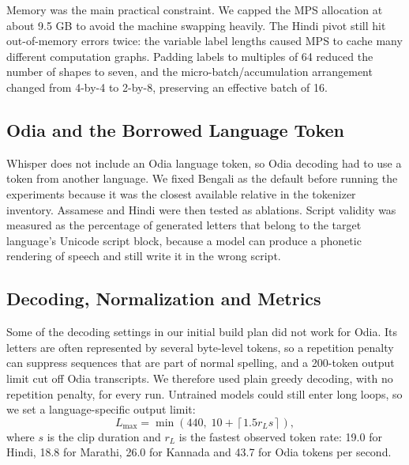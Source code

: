\documentclass[conference]{IEEEtran}
\begin{document}
Memory was the main practical constraint. We capped the MPS allocation
at about 9.5 GB to avoid the machine swapping heavily. The Hindi pivot
still hit out-of-memory errors twice: the variable label lengths caused
MPS to cache many different computation graphs. Padding labels to
multiples of 64 reduced the number of shapes to seven, and the
micro-batch/accumulation arrangement changed from 4-by-4 to 2-by-8,
preserving an effective batch of 16.

\subsection{Odia and the Borrowed Language Token}

Whisper does not include an Odia language token, so Odia decoding had
to use a token from another language. We fixed Bengali as the default
before running the experiments because it was the closest available
relative in the tokenizer inventory. Assamese and Hindi were then tested
as ablations. Script validity was measured as the percentage of
generated letters that belong to the target language's Unicode script
block, because a model can produce a phonetic rendering of speech and
still write it in the wrong script.

\subsection{Decoding, Normalization and Metrics}

Some of the decoding settings in our initial build plan did not work
for Odia. Its letters are often represented by several byte-level
tokens, so a repetition penalty can suppress sequences that are part of
normal spelling, and a 200-token output limit cut off Odia transcripts.
We therefore used plain greedy decoding, with no repetition penalty,
for every run. Untrained models could still enter long loops, so we
set a language-specific output limit:
\begin{equation*}
L_{\max}=\min\left(440,\;10+\left\lceil1.5r_Ls\right\rceil\right),
\end{equation*}
where $s$ is the clip duration and $r_L$ is the fastest observed token
rate: 19.0 for Hindi, 18.8 for Marathi, 26.0 for Kannada and 43.7 for
Odia tokens per second.
\end{document}
